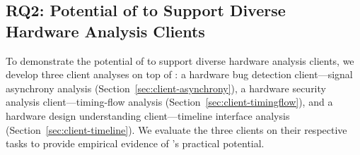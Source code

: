 \subsection{RQ2: Potential of \tia to Support Diverse Hardware Analysis Clients}

To demonstrate the potential of \tia to support diverse hardware analysis clients, we develop three client analyses on top of \tia:
a hardware bug detection client---signal asynchrony analysis (Section~\ref{sec:client-asynchrony}),
a hardware security analysis client---timing-flow analysis (Section~\ref{sec:client-timingflow}),
and a hardware design understanding client---timeline interface analysis (Section~\ref{sec:client-timeline}).
We evaluate the three clients on their respective tasks to provide empirical evidence of \tia's practical potential.





